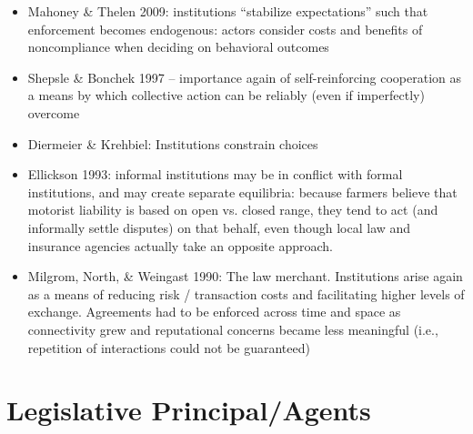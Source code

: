 \documentclass[12pt]{article}
\begin{document}
\begin{itemize}
    \begin{itemize}
        \item There must be some sanction, and that sanction must not simply be a behavioral irregularity: Brinks example that removing a hat in church is an informal institution, but removing a coat in a restaurant is just a behavioral regularity
        \item ``Informal institutions are widely viewed as obstacles to normatively desirable outcomes, and for good reason. Because they are unwritten and unregulated, informal rules generally lack the transparency or public oversight that is often essential to accountability.''
        \item Important to consider the alignment (or lack thereof) between formal and informal institutional outcomes: do the informal institutions produce a similar result?
    \end{itemize}
    \item Mahoney \& Thelen 2009: institutions ``stabilize expectations'' such that enforcement becomes endogenous: actors consider costs and benefits of noncompliance when deciding on behavioral outcomes
    \item Shepsle \& Bonchek 1997 -- importance again of self-reinforcing cooperation as a means by which collective action can be reliably (even if imperfectly) overcome
    \item Diermeier \& Krehbiel: Institutions constrain choices
    \item Ellickson 1993: informal institutions may be in conflict with formal institutions, and may create separate equilibria: because farmers believe that motorist liability is based on open vs. closed range, they tend to act (and informally settle disputes) on that behalf, even though local law and insurance agencies actually take an opposite approach.
    \item Milgrom, North, \& Weingast 1990: The law merchant. Institutions arise again as a means of reducing risk / transaction costs and facilitating higher levels of exchange. Agreements had to be enforced across time and space as connectivity grew and reputational concerns became less meaningful (i.e., repetition of interactions could not be guaranteed)
\end{itemize}


\section*{Legislative Principal/Agents}
\end{document}
